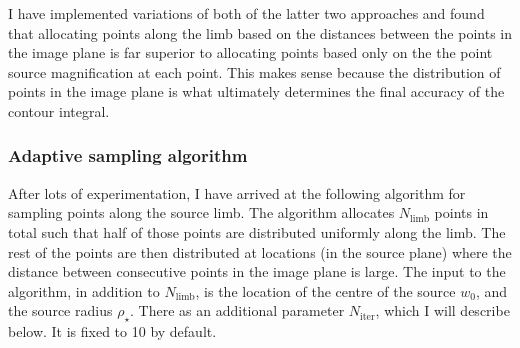 \documentclass[12pt,dvipsnames]{report}
\begin{document}
I have implemented variations of both of the latter two
approaches  and found that allocating points along the limb based on the distances 
between the points in the image plane is far superior to allocating points based only
on the the point source magnification at each point.
This makes sense because the distribution of points in the image 
plane is what ultimately determines the final accuracy of the contour integral.

\subsubsection{Adaptive sampling algorithm}
After lots of experimentation, I have arrived at the following algorithm for sampling 
points along the source limb.
The algorithm allocates $N_\mathrm{limb}$ points in total such that half of 
those points are distributed uniformly along the limb. 
The rest of the points are then distributed at locations (in the source plane) where the 
distance between consecutive points in the image plane is large. 
The input to the algorithm, in addition to $N_\mathrm{limb}$,
is the location of the centre of the source $w_0$, and the source radius $\rho_\star$. There 
as an additional parameter $N_\mathrm{iter}$, which I will describe below. 
It is fixed to 10 by default. 
\end{document}
